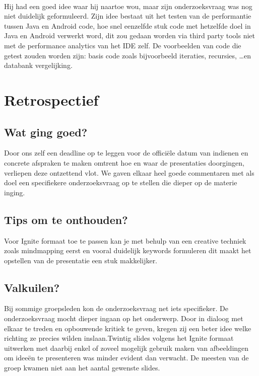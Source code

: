 \documentclass[fleqn,10pt]{voorstel}
\begin{document}
\paragraph{\cite{DeCroock2016}}
Hij had een goed idee waar hij naartoe wou, maar zijn onderzoeksvraag was nog niet duidelijk geformuleerd. 
Zijn idee bestaat uit het testen van de performantie tussen Java en Android code, hoe snel eenzelfde stuk code met hetzelfde doel in Java en Android verwerkt word, dit zou gedaan worden via third party tools niet met de performance analytics van het IDE zelf. De voorbeelden van code die getest zouden worden zijn: basis code zoals bijvoorbeeld iteraties, recursies, \dots en databank vergelijking.

\section{Retrospectief}
\subsection{Wat ging goed?}
Door ons zelf een deadline op te leggen voor de officiële datum van indienen en concrete afspraken te maken omtrent hoe en waar de presentaties doorgingen, verliepen deze ontzettend vlot. We gaven elkaar heel goede commentaren met als doel een specifiekere onderzoeksvraag op te stellen die dieper op de materie inging. 

\subsection{Tips om te onthouden?}
Voor Ignite formaat toe te passen kan je met behulp van een creative techniek zoals mindmapping eerst en vooral duidelijk keywords formuleren dit maakt het opstellen van de presentatie een stuk makkelijker.

\subsection{Valkuilen?}
Bij sommige groepsleden kon de onderzoeksvraag net iets specifieker. De onderzoeksvraag mocht dieper ingaan op het onderwerp. Door in dialoog met elkaar te treden en opbouwende kritiek te geven, kregen zij een beter idee welke richting ze precies wilden inslaan.Twintig slides volgens het Ignite formaat uitwerken met daarbij enkel of zoveel mogelijk gebruik maken van afbeeldingen om ideeën te presenteren was minder evident dan verwacht. De meesten van de groep kwamen niet aan het aantal gewenste slides.
\end{document}
